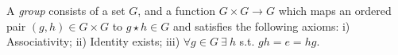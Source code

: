  A \textit{group} consists of a set $G$, and a function $G \times G \to G$ which maps an ordered pair $(g,h) \in G \times G$ to $g \star h \in G$ and satisfies the following axioms:
i) Associativity; 
ii) Identity exists; 
iii) $\forall g \in G\ \exists\ h$ s.t. $gh = e = hg$.